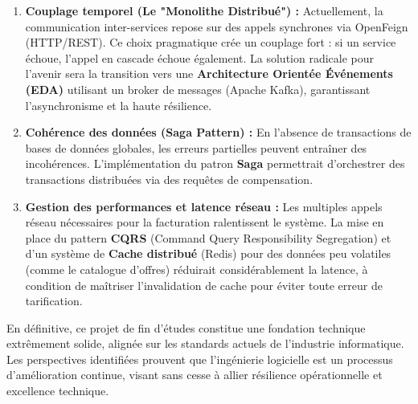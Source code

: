 \begin{enumerate}
    \item \textbf{Couplage temporel (Le "Monolithe Distribué") :} Actuellement, la communication inter-services repose sur des appels synchrones via OpenFeign (HTTP/REST). Ce choix pragmatique crée un couplage fort : si un service échoue, l'appel en cascade échoue également. La solution radicale pour l'avenir sera la transition vers une \textbf{Architecture Orientée Événements (EDA)} utilisant un broker de messages (Apache Kafka), garantissant l'asynchronisme et la haute résilience.
    
    \item \textbf{Cohérence des données (Saga Pattern) :} En l'absence de transactions de bases de données globales, les erreurs partielles peuvent entraîner des incohérences. L'implémentation du patron \textbf{Saga} permettrait d'orchestrer des transactions distribuées via des requêtes de compensation.
    
    \item \textbf{Gestion des performances et latence réseau :} Les multiples appels réseau nécessaires pour la facturation ralentissent le système. La mise en place du pattern \textbf{CQRS} (Command Query Responsibility Segregation) et d'un système de \textbf{Cache distribué} (Redis) pour des données peu volatiles (comme le catalogue d'offres) réduirait considérablement la latence, à condition de maîtriser l'invalidation de cache pour éviter toute erreur de tarification.
\end{enumerate}

En définitive, ce projet de fin d'études constitue une fondation technique extrêmement solide, alignée sur les standards actuels de l'industrie informatique. Les perspectives identifiées prouvent que l'ingénierie logicielle est un processus d'amélioration continue, visant sans cesse à allier résilience opérationnelle et excellence technique.

\newpage
